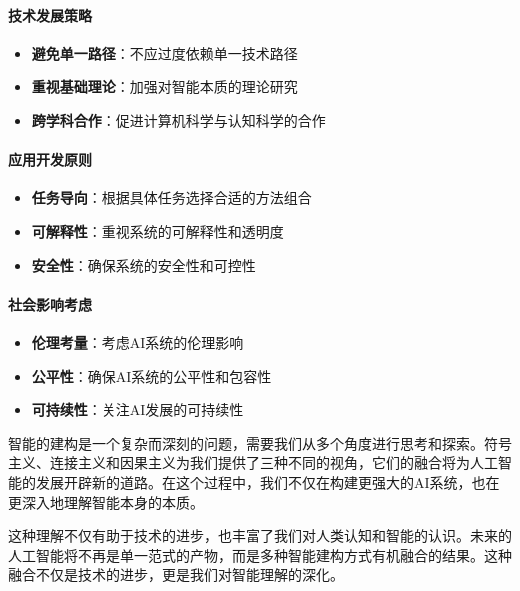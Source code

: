 \paragraph{技术发展策略}
\begin{itemize}
\item \textbf{避免单一路径}：不应过度依赖单一技术路径
\item \textbf{重视基础理论}：加强对智能本质的理论研究
\item \textbf{跨学科合作}：促进计算机科学与认知科学的合作
\end{itemize}

\paragraph{应用开发原则}
\begin{itemize}
\item \textbf{任务导向}：根据具体任务选择合适的方法组合
\item \textbf{可解释性}：重视系统的可解释性和透明度
\item \textbf{安全性}：确保系统的安全性和可控性
\end{itemize}

\paragraph{社会影响考虑}
\begin{itemize}
\item \textbf{伦理考量}：考虑AI系统的伦理影响
\item \textbf{公平性}：确保AI系统的公平性和包容性
\item \textbf{可持续性}：关注AI发展的可持续性
\end{itemize}

智能的建构是一个复杂而深刻的问题，需要我们从多个角度进行思考和探索。符号主义、连接主义和因果主义为我们提供了三种不同的视角，它们的融合将为人工智能的发展开辟新的道路。在这个过程中，我们不仅在构建更强大的AI系统，也在更深入地理解智能本身的本质。

这种理解不仅有助于技术的进步，也丰富了我们对人类认知和智能的认识。未来的人工智能将不再是单一范式的产物，而是多种智能建构方式有机融合的结果。这种融合不仅是技术的进步，更是我们对智能理解的深化。